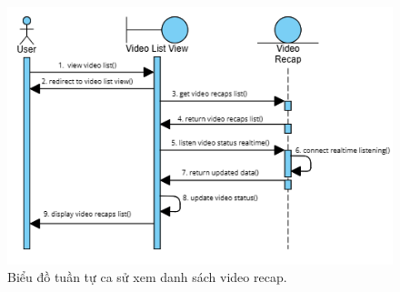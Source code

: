 \begin{figure}[H]
    \centering  
    \includegraphics[width=1\textwidth]{figures/c3/3-3-8-sequence-diagram.png}
    \caption{Biểu đồ tuần tự ca sử xem danh sách video recap.}
    \label{fig:3-3-8-sequence-diagram}
\end{figure}